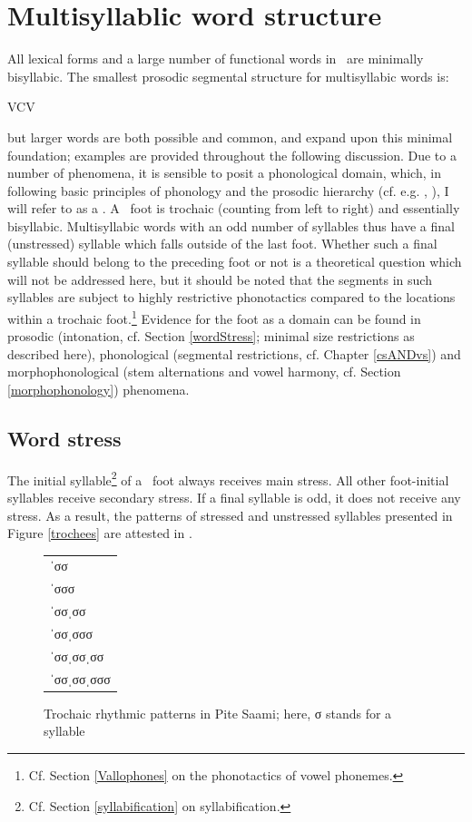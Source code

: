 \section{Multisyllablic word structure}\label{multisyllabicWords}
All lexical forms and a large number of functional words in \PS\ are minimally bisyllabic. The smallest prosodic segmental structure for multisyllabic words is: \begin{center}VCV\end{center} but larger words are both possible and common, and expand upon this minimal foundation; examples are provided throughout the following discussion. Due to a number of phenomena, it is sensible to posit a phonological domain, which, in following basic principles of phonology  %
and the prosodic hierarchy %
(cf. e.g. \citet[280-283]{dixon2010a}, \citet{Selkirk1980,Hayes1989,NesporVogel1986}), I will refer to as a . A \PS\ foot is trochaic (counting from left to right) and essentially bisyllabic. Multisyllabic words with an odd number of syllables thus have a final (unstressed) syllable which falls outside of the last foot. 
Whether such a final syllable should belong to the preceding foot or not is a theoretical question which will not be addressed here, but it should be noted that the segments in such syllables are subject to highly restrictive phonotactics compared to the locations within a trochaic foot.\footnote{Cf. Section \ref{Vallophones} on the phonotactics of vowel phonemes.} 
Evidence for the foot as a domain can be found in prosodic (intonation, cf. Section \ref{wordStress}; minimal size restrictions as described here), phonological (segmental restrictions, cf. Chapter \ref{csANDvs}) and morphophonological (stem alternations and vowel harmony, cf. Section \ref{morphophonology}) phenomena. 



\subsection{Word stress}\label{wordStress}
The initial syllable\footnote{Cf. Section \ref{syllabification} on syllabification.} 
of a \PS\ foot always receives main stress. All other foot-initial syllables receive secondary stress. If a final syllable is odd, it does not receive any stress. As a result, the patterns of stressed and unstressed syllables presented in Figure \vref{trochees} are attested in \PS. 
\begin{figure}
\centering
\begin{tabular}{l}
ˈσσ \\
ˈσσσ \\
ˈσσˌσσ \\
ˈσσˌσσσ \\
ˈσσˌσσˌσσ \\
ˈσσˌσσˌσσσ \\
\end{tabular}
\caption[Trochaic rhythmic patterns in Pite Saami]{Trochaic rhythmic patterns in Pite Saami; here, σ stands for a syllable}\label{trochees}
\end{figure}

